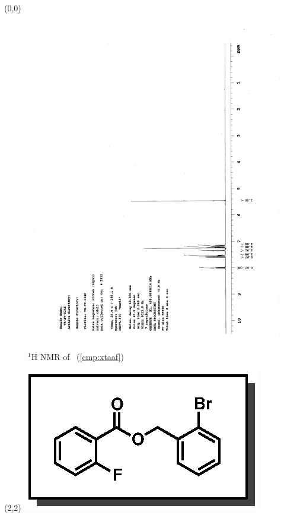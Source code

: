 \begin{textblock}{20}(0,0)
\begin{figure}[htb]
\caption{$^1$H NMR of \CMPxtaaf\ (\ref{cmp:xtaaf})}
\includegraphics[scale=0.75, trim = 0mm 0mm 0mm 5mm,
clip]{chp_asymmetric/images/nmr/xtaafH}
\vspace{-100pt}
\end{figure}
\end{textblock}
\begin{textblock}{1}(2,2)
\includegraphics[scale=0.8, angle=90]{chp_asymmetric/images/xtaaf}
\end{textblock}
